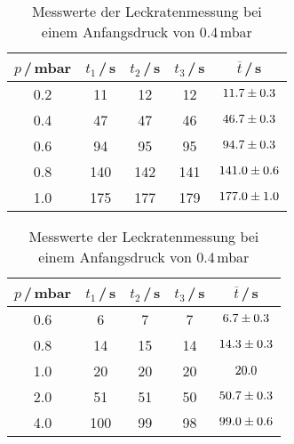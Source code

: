 \begin{table}[H]
  \begin{minipage}{0.45\textwidth}
    \caption{Messwerte der Leckratenmessung bei\\ einem Anfangsdruck von 0.1\,mbar}
    \begin{tabular}{c|c|c|c|c}
      $p$\,/\,mbar & $t_1$\,/\,s & $t_2$\,/\,s & $t_3$\,/\,s & $\overline{t}$\,/\,s \\
      \hline
      0.2 & 11  & 12  & 12  & $\num{11.7 +- 0.3}$ \\
      0.4 & 47  & 47  & 46  & $\num{46.7 +- 0.3}$ \\
      0.6 & 94  & 95  & 95  & $\num{94.7 +- 0.3}$ \\
      0.8 & 140 & 142 & 141 & $\num{141.0 +- 0.6}$ \\
      1.0 & 175 & 177 & 179 & $\num{177.0 +- 1.0}$ \\
    \end{tabular}
  \end{minipage}\hfill
  \begin{minipage}{0.45\textwidth}
    \caption{Messwerte der Leckratenmessung bei\\ einem Anfangsdruck von 0.4\,mbar}
    \begin{tabular}{c|c|c|c|c}
      $p$\,/\,mbar & $t_1$\,/\,s & $t_2$\,/\,s & $t_3$\,/\,s & $\overline{t}$\,/\,s \\
      \hline
      0.6 & 6   & 7  & 7  & $\num{6.7 +- 0.3}$ \\
      0.8 & 14  & 15 & 14 & $\num{14.3 +- 0.3}$ \\
      1.0 & 20  & 20 & 20 & $\num{20.0 +- 0.0}$ \\
      2.0 & 51  & 51 & 50 & $\num{50.7 +- 0.3}$ \\
      4.0 & 100 & 99 & 98 & $\num{99.0 +- 0.6}$ \\
    \end{tabular}
  \end{minipage}
\end{table}

